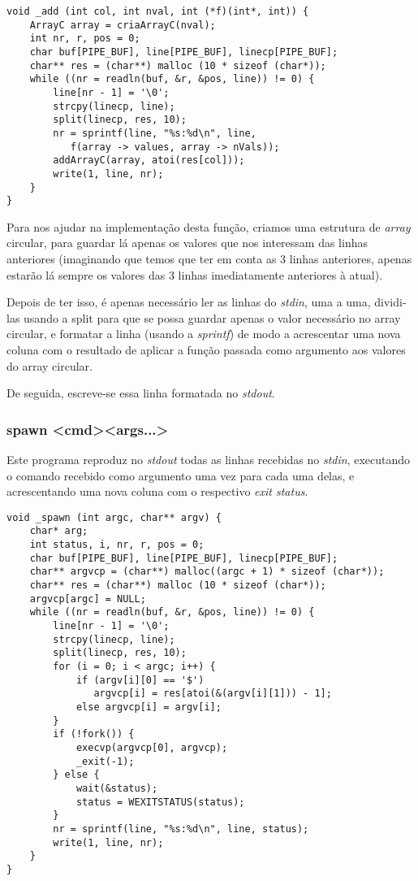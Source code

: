 \documentclass[a4paper]{article}
\begin{document}
\begin{Verbatim}[obeytabs]
void _add (int col, int nval, int (*f)(int*, int)) {
	ArrayC array = criaArrayC(nval);
	int nr, r, pos = 0;
	char buf[PIPE_BUF], line[PIPE_BUF], linecp[PIPE_BUF];
	char** res = (char**) malloc (10 * sizeof (char*));
	while ((nr = readln(buf, &r, &pos, line)) != 0) {
		line[nr - 1] = '\0';
		strcpy(linecp, line);
		split(linecp, res, 10);
		nr = sprintf(line, "%s:%d\n", line,
		   f(array -> values, array -> nVals));
		addArrayC(array, atoi(res[col]));
		write(1, line, nr);
	}
}
\end{Verbatim}

Para nos ajudar na implementação desta função, criamos uma estrutura de \textit{array} circular, para guardar lá apenas os valores que nos interessam das linhas anteriores (imaginando que temos que ter em conta as 3 linhas anteriores, apenas estarão lá sempre os valores das 3 linhas imediatamente anteriores à atual).

Depois de ter isso, é apenas necessário ler as linhas do \textit{stdin}, uma a uma, dividi-las usando a split para que se possa guardar apenas o valor necessário no array circular, e formatar a linha (usando a \textit{sprintf}) de modo a acrescentar uma nova coluna com o resultado de aplicar a função passada como argumento aos valores do array circular.

De seguida, escreve-se essa linha formatada no \textit{stdout}.

\subsubsection{spawn \textless cmd\textgreater \textless args...\textgreater}

Este programa reproduz no \textit{stdout} todas as linhas recebidas no \textit{stdin}, executando o comando recebido como argumento uma vez para cada uma delas, e acrescentando uma nova coluna com o respectivo \textit{exit status}.

\begin{Verbatim}[obeytabs]
void _spawn (int argc, char** argv) {
	char* arg;
	int status, i, nr, r, pos = 0;
	char buf[PIPE_BUF], line[PIPE_BUF], linecp[PIPE_BUF];
	char** argvcp = (char**) malloc((argc + 1) * sizeof (char*));
	char** res = (char**) malloc (10 * sizeof (char*));
	argvcp[argc] = NULL;
	while ((nr = readln(buf, &r, &pos, line)) != 0) {
		line[nr - 1] = '\0';
		strcpy(linecp, line);
		split(linecp, res, 10);
		for (i = 0; i < argc; i++) {
			if (argv[i][0] == '$') 
			   argvcp[i] = res[atoi(&(argv[i][1])) - 1];
			else argvcp[i] = argv[i];
		}
		if (!fork()) {
			execvp(argvcp[0], argvcp);
			_exit(-1);
		} else {
			wait(&status);
			status = WEXITSTATUS(status);
		}
		nr = sprintf(line, "%s:%d\n", line, status);
		write(1, line, nr);
	}
}
\end{Verbatim}
\end{document}
